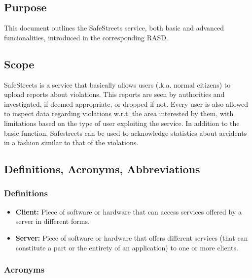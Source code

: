 \subsection{Purpose}

This document outlines the SafeStreets service, both basic and advanced funcionalities, introduced in the corresponding RASD.

\subsection{Scope}

SafeStreets is a service that basically allows users (\a.k.a. normal citizens) to upload reports about violations. This reports are seen by authorities and investigated, if deemed appropriate, or dropped if not. Every user is also allowed to inspect data regarding violations w.r.t. the area interested by them, with limitations based on the type of user exploiting the service.
In addition to the basic function, Safestreets can be used to acknowledge statistics about accidents in a fashion similar to that of the violations.

\subsection{Definitions, Acronyms, Abbreviations}

\subsubsection{Definitions}

\begin{itemize}

\item \textbf{Client:}  Piece of software or hardware that can access services offered by a server in different forms.

\item \textbf{Server:} Piece of software or hardware that offers different services (that can constitute a part or the entirety of an application) to one or more clients.


\end{itemize}

\subsubsection{Acronyms}

